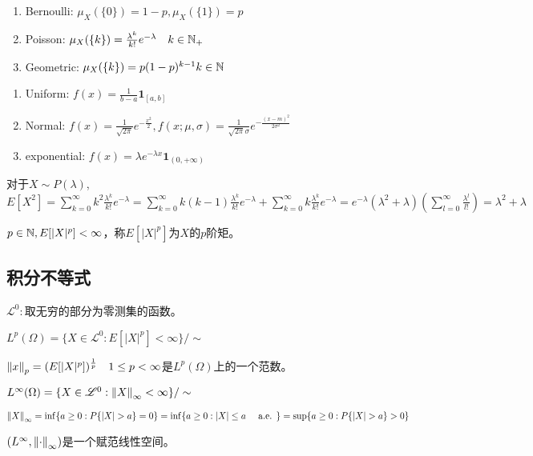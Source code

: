 \documentclass{ctexart}
\begin{document}
\begin{Eg}
  \begin{enumerate}
  \item Bernoulli: $\mu_{X}(\{0\})=1-p,\mu_{X}(\{1\})=p$
  \item Poisson: $\mu_{X}(\{k\})=\frac{\lambda^{k}}{k!}e^{-\lambda}\quad k\in\mathbb{N}_{+}$
  \item Geometric: $\mu_{X}(\{k\})=p(1-p)^{k-1} k\in\mathbb{N}$
  \end{enumerate}

  \begin{enumerate}
  \item Uniform: $f(x)=\frac{1}{b-a}\bm 1_{[a,b]}$
  \item Normal: $f(x)=\frac{1}{\sqrt{2\pi}}e^{-\frac{x^{2}}{2}},f(x;\mu,\sigma)=\frac{1}{\sqrt{2\pi}\sigma}e^{-\frac{(x-m)^{2}}{2\sigma^{2}}}$
  \item exponential: $f(x)=\lambda e^{-\lambda x}\bm 1_{(0,+\infty)}$
  \end{enumerate}
\end{Eg}

\begin{Eg}
  对于$X\sim P(\lambda)$, $E[X^{2}]=\sum_{k=0}^{\infty}k^{2}\frac{\lambda^{k}}{k!}e^{-\lambda}=\sum_{k=0}^{\infty}k(k-1)\frac{\lambda^{k}}{k!}e^{-\lambda}+\sum_{k=0}^{\infty}k\frac{\lambda^{k}}{k!}e^{-\lambda}=e^{-\lambda}(\lambda^{2}+\lambda)(\sum_{l=0}^{\infty}\frac{\lambda^{l}}{l!})=\lambda^{2}+\lambda$
\end{Eg}

\begin{Def}[矩，moment]
  $p\in \mathbb{N}, E[|X|^{p}]<\infty$，称$E[|X|^{p}]$为$X$的$p$阶矩。
\end{Def}

\subsection{积分不等式}
$\mathscr{L}^{0}:$取无穷的部分为零测集的函数。

\begin{Def}
  $L^{p}(\Omega)=\{X\in \mathscr{L}^{0}:E[|X|^{p}]<\infty\}/\sim$

  $\left\|x\right\|_{p}=(E[|X|^{p}])^{\frac 1 p}\quad 1\leq p<\infty$是$L^{p}(\Omega)$上的一个范数。

  $L^{\infty}(\Omega)=\{X\in\mathscr{L}^{0}:\left\|X\right\|_{\infty}<\infty\}/\sim$

  $\nm{X}_{\infty}=\inf\{a\geq 0:P\{|X|>a\}=0\}=\inf\{a\geq 0: |X|\leq a\quad\alev\}=\sup\{a\geq 0: P\{|X|>a\}>0\}$

  $(L^{\infty},\left\|\cdot\right\|_{\infty})$是一个赋范线性空间。
\end{Def}
\end{document}
